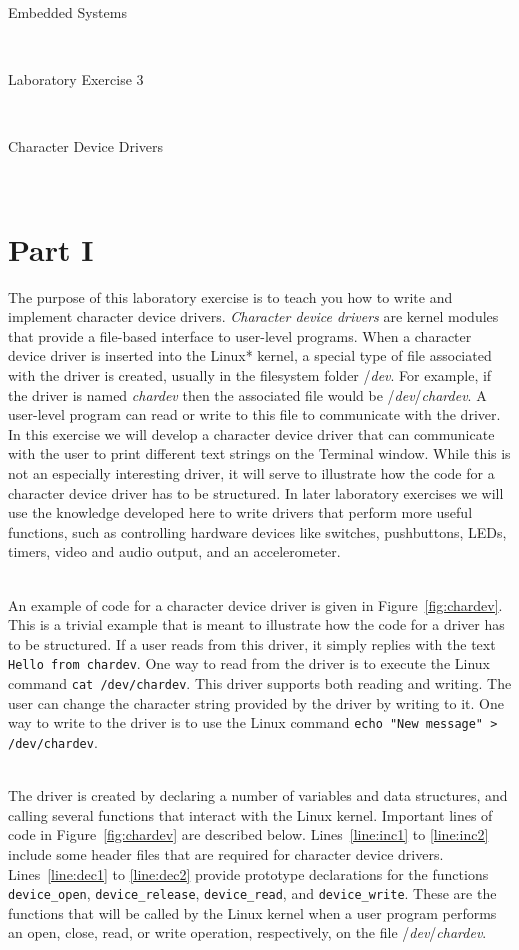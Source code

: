 \documentclass[epsfig,10pt,fullpage]{article}
\newcommand{\LabNum}{3}
\begin{document}
\centerline{\huge Embedded Systems}
~\\
\centerline{\huge Laboratory Exercise \LabNum}
~\\
\centerline{\large Character Device Drivers}
~\\

\section*{Part I}
\noindent
The purpose of this laboratory exercise is to teach you how to write and implement character 
device drivers. {\it Character device drivers} are kernel modules that provide a file-based 
interface to user-level programs. When a character device driver is inserted into the 
Linux* kernel, a special type of file associated with the driver is created, usually in the 
filesystem folder /{\it dev}. For example, if the driver is named {\it chardev} then the 
associated file would be /{\it dev}/{\it chardev}. A user-level program can read or write to 
this file to communicate with the driver. In this exercise we will develop a character
device driver that can communicate with the user to print different text strings on the
Terminal window. While this is not an especially interesting driver, it will serve to illustrate 
how the code for a character device driver has to be structured. In later laboratory exercises we
will use the knowledge developed here to write drivers that perform more useful functions,
such as controlling hardware devices like switches, pushbuttons, LEDs, timers, video and
audio output, and an accelerometer.

~\\
\noindent
An example of code for a character device driver is given in Figure~\ref{fig:chardev}.
This is a trivial example that is meant to illustrate how the code for a driver has to be
structured. If a user reads from this driver, it simply replies with the text
\texttt{Hello from chardev}. One way to read from the driver is to execute the Linux command
\texttt{cat /dev/chardev}. This driver supports both reading and writing.
The user can change the character string provided by the driver
by writing to it. One way to write to the driver is to use the Linux command
\texttt{echo "New message" > /dev/chardev}.

~\\
\noindent
The driver is created by declaring a number of variables and data structures, and calling
several functions that interact with the Linux kernel. Important lines of code in
Figure~\ref{fig:chardev} are described below. Lines~\ref{line:inc1} to \ref{line:inc2} 
include some header files that are required for character device drivers.
Lines~\ref{line:dec1} to \ref{line:dec2} 
provide prototype declarations for the functions \texttt{device\_open}, \texttt{device\_release},
\texttt{device\_read}, and \texttt{device\_write}. These are the functions that will be 
called by the Linux kernel when a user program performs an open, close, read, or write 
operation, respectively, on the file /{\it dev}/{\it chardev}.
\end{document}
